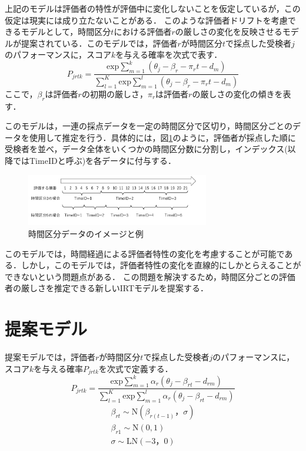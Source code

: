 \documentclass[dvipdfmx, twocolumn, a4paper]{hcresume}
\begin{document}
上記のモデルは評価者の特性が評価中に変化しないことを仮定しているが，この仮定は現実には成り立たないことがある．
このような評価者ドリフトを考慮できるモデルとして，時間区分$t$における評価者$r$の厳しさの変化を反映させるモデルが提案されている\cite{Raudenbush}．このモデルでは，評価者$r$が時間区分$t$で採点した受検者$j$のパフォーマンスに，スコア$k$を与える確率を次式で表す．
\begin{equation}
  P_{jrtk}=\frac{\mathrm{exp}\sum_{m=1}^{k}(\theta_{j}-\beta_{r} - \pi_{r}t-d_{m})}{\sum_{l=1}^{K}\mathrm{exp}\sum_{m=1}^{l}(\theta_{j}-\beta_{r} - \pi_{r}t-d_{m})}
\end{equation}
ここで，$\beta_{r}$は評価者$r$の初期の厳しさ，$\pi_{r}$は評価者$r$の厳しさの変化の傾きを表す．

このモデルは，一連の採点データを一定の時間区分で区切り，時間区分ごとのデータを使用して推定を行う．具体的には，図\ref{timeid}のように，評価者が採点した順に受検者を並べ，データ全体をいくつかの時間区分数に分割し，インデックス(以降ではTimeIDと呼ぶ)を各データに付与する．

\begin{figure}[t]
  \centering
  \includegraphics[width=8cm]{img/timeid.png}
  \caption{時間区分データのイメージと例}
  \label{timeid}
\end{figure}

このモデルでは，時間経過による評価者特性の変化を考慮することが可能である．しかし，このモデルでは，評価者特性の変化を直線的にしかとらえることができないという問題点がある．
この問題を解決するため，時間区分ごとの評価者の厳しさを推定できる新しいIRTモデルを提案する．
\section{提案モデル}
提案モデルでは，評価者$r$が時間区分$t$で採点した受検者$j$のパフォーマンスに，スコア$k$を与える確率$P_{jrtk}$を次式で定義する．
\begin{equation}
  P_{jrtk}=\frac{\mathrm{exp}\sum^k_{m=1}{\alpha_r(\theta_{j}-\beta_{rt}-d_{rm})}}{\sum^K_{l=1} \mathrm{exp}\sum^l_{m=1}{\alpha_r(\theta_{j}-\beta_{rt}-d_{rm})}}
\end{equation}
\begin{eqnarray}
  \beta_{rt}\sim \mathrm{N}(\beta_{r(t-1)}，\sigma)\nonumber\\
  \beta_{r1} \sim \mathrm{N}(0,1)\nonumber\\
  \sigma \sim \mathrm{LN}(-3，0)\nonumber
\end{eqnarray}
\end{document}
